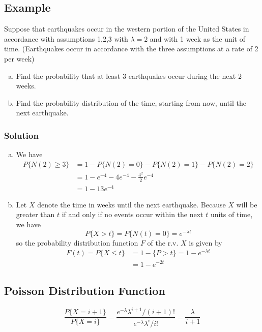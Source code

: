 \subsection*{Example}
Suppose that earthquakes occur in the western portion of the United States in accordance with assumptions 1,2,3 with $\lambda = 2$ and with 1 week as the unit of time. (Earthquakes occur in accordance with the three assumptions at a rate of 2 per week)
\begin{enumerate}[a. ]
    \item Find the probability that at least 3 earthquakes occur during the next 2 weeks. 
    \item Find the probability distribution of the time, starting from now, until the next earthquake. 
\end{enumerate}
\subsubsection*{Solution}
\begin{enumerate}[a. ]
    \item We have \begin{equation*}
        \begin{split}
            P\{N(2)\geq 3\} &= 1 - P\{N(2) = 0\} - P\{N(2) = 1\} - P\{N(2) = 2\}\\
            &= 1- e^{-4} - 4e^{-4} - \frac{4^2}{2}e^{-4}\\
            &= 1 - 13e^{-4}
        \end{split}
    \end{equation*}
    \item Let $X$ denote the time in weeks until the next earthquake. Because $X$ will be greater than $t$ if and only if no events occur within the next $t$ units of time, we have \[P\{X > t\} = P\{N(t) = 0\} = e^{-\lambda t}\]
    so the probability distribution function $F$ of the r.v. $X$ is given by 
    \begin{equation*}
        \begin{split}
            F(t) = P\{X\leq t\} &= 1- \{P > t\} = 1 - e^{-\lambda t}\\
            &= 1 - e^{-2t}
        \end{split}
    \end{equation*}
\end{enumerate}
\subsection{Poisson Distribution Function}
\[\frac{P\{X = i + 1\}}{P\{X = i\}} = \frac{e^{-\lambda}\lambda^{i+1}/(i+1)!}{e^{-\lambda}\lambda^i/i!} = \frac{\lambda}{i+1}\]
